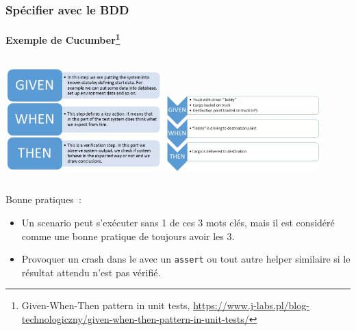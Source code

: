 \documentclass{beamer}
\begin{document}
    \begin{frame}
        \frametitle{Spécifier avec le BDD}
        \framesubtitle{Exemple de Cucumber\footnote{Given-When-Then pattern in unit tests, \url{https://www.j-labs.pl/blog-technologiczny/given-when-then-pattern-in-unit-tests/}}}
        \transdissolve
        \begin{columns}
            \centering
            \includegraphics[width=6cm]{image/given-when-then}
            \centering
            \includegraphics[width=6cm]{image/given-when-then-exemple}
        \end{columns}
        Bonne pratiques~:
        \begin{itemize}
            \item Un scenario peut s'exécuter sans 1 de ces 3 mots clés, mais il est considéré comme une bonne pratique de toujours avoir les 3.

            \item Provoquer un crash dans le  avec un \lstinline{assert} ou tout autre helper similaire si le résultat attendu n'est pas vérifié.
        \end{itemize}
    \end{frame}
\end{document}
